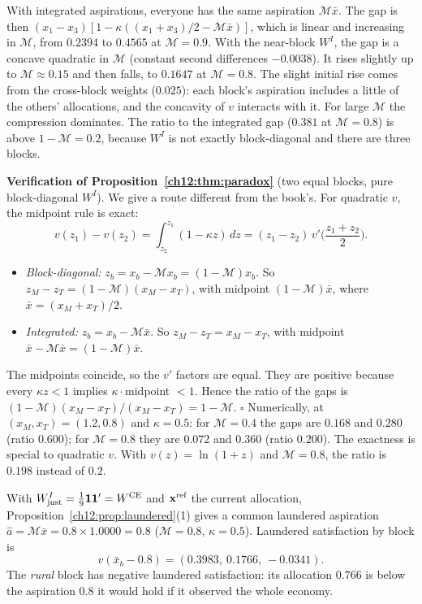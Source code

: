 \documentclass[../solutions_manual.tex]{subfiles}
\begin{document}
With integrated aspirations, everyone has the same aspiration $\mathcal{M}\bar x$. The gap is then $(x_1 - x_3)[1 - \kappa((x_1 + x_3)/2 - \mathcal{M}\bar x)]$, which is linear and increasing in $\mathcal{M}$, from $0.2394$ to $0.4565$ at $\mathcal{M} = 0.9$. With the near-block $W^I$, the gap is a concave quadratic in $\mathcal{M}$ (constant second differences $-0.0038$). It rises slightly up to $\mathcal{M} \approx 0.15$ and then falls, to $0.1647$ at $\mathcal{M} = 0.8$. The slight initial rise comes from the cross-block weights ($0.025$): each block's aspiration includes a little of the others' allocations, and the concavity of $v$ interacts with it. For large $\mathcal{M}$ the compression dominates. The ratio to the integrated gap ($0.381$ at $\mathcal{M} = 0.8$) is above $1 - \mathcal{M} = 0.2$, because $W^I$ is not exactly block-diagonal and there are three blocks.

\textbf{Verification of Proposition~\ref{ch12:thm:paradox}} (two equal blocks, pure block-diagonal $W^I$). We give a route different from the book's. For quadratic $v$, the midpoint rule is exact:
\[
v(z_1) - v(z_2) = \int_{z_2}^{z_1}(1 - \kappa z)\,dz = (z_1 - z_2)\,v'\!\Big(\frac{z_1 + z_2}{2}\Big).
\]
\begin{itemize}
\item \emph{Block-diagonal:} $z_b = x_b - \mathcal{M}x_b = (1-\mathcal{M})x_b$. So $z_M - z_T = (1-\mathcal{M})(x_M - x_T)$, with midpoint $(1-\mathcal{M})\bar x$, where $\bar x = (x_M + x_T)/2$.
\item \emph{Integrated:} $z_b = x_b - \mathcal{M}\bar x$. So $z_M - z_T = x_M - x_T$, with midpoint $\bar x - \mathcal{M}\bar x = (1-\mathcal{M})\bar x$.
\end{itemize}
The midpoints coincide, so the $v'$ factors are equal. They are positive because every $\kappa z < 1$ implies $\kappa\cdot$midpoint $< 1$. Hence the ratio of the gaps is $(1-\mathcal{M})(x_M - x_T)/(x_M - x_T) = 1 - \mathcal{M}$. $\square$ Numerically, at $(x_M, x_T) = (1.2, 0.8)$ and $\kappa = 0.5$: for $\mathcal{M} = 0.4$ the gaps are $0.168$ and $0.280$ (ratio $0.600$); for $\mathcal{M} = 0.8$ they are $0.072$ and $0.360$ (ratio $0.200$). The exactness is special to quadratic $v$. With $v(z) = \ln(1+z)$ and $\mathcal{M} = 0.8$, the ratio is $0.198$ instead of $0.2$.

With $W^I_{\text{just}} = \frac19\mathbf{1}\mathbf{1}' = W^{\text{CE}}$ and $\mathbf{x}^{\text{ref}}$ the current allocation, Proposition~\ref{ch12:prop:laundered}(1) gives a common laundered aspiration $\hat a = \mathcal{M}\bar x = 0.8\times 1.0000 = 0.8$ ($\mathcal{M} = 0.8$, $\kappa = 0.5$). Laundered satisfaction by block is
\[
v(\bar x_b - 0.8) = (0.3983,\ 0.1766,\ -0.0341).
\]
The \emph{rural} block has negative laundered satisfaction: its allocation $0.766$ is below the aspiration $0.8$ it would hold if it observed the whole economy.
\end{document}
